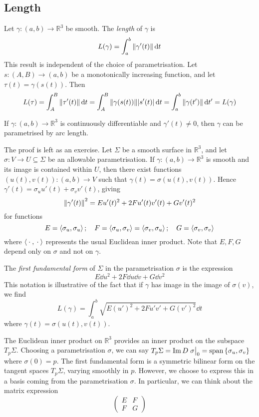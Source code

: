\subsection{Length}
Let \( \gamma \colon (a,b) \to \mathbb R^3 \) be smooth.
The \textit{length} of \( \gamma \) is
\[ L(\gamma) = \int_a^b \norm{\gamma'(t)} \dd{t} \]
This result is independent of the choice of parametrisation.
Let \( s \colon (A,B) \to (a,b) \) be a monotonically increasing function, and let \( \tau(t) = \gamma(s(t)) \).
Then
\[ L(\tau) = \int_A^B \norm{\tau'(t)} \dd{t} = \int_A^B \norm{\gamma(s(t))} \abs{s'(t)} \dd{t} = \int_a^b \norm{\gamma(t')} \dd{t'} = L(\gamma) \]
\begin{lemma}
	If \( \gamma \colon (a,b) \to \mathbb R^3 \) is continuously differentiable and \( \gamma'(t) \neq 0 \), then \( \gamma \) can be parametrised by arc length.
\end{lemma}
The proof is left as an exercise.
Let \( \Sigma \) be a smooth surface in \( \mathbb R^3 \), and let \( \sigma \colon V \to U \subseteq \Sigma \) be an allowable parametrisation.
If \( \gamma \colon (a,b) \to \mathbb R^3 \) is smooth and its image is contained within \( U \), then there exist functions \( (u(t), v(t)) \colon (a,b) \to V \) such that \( \gamma(t) = \sigma(u(t), v(t)) \).
Hence \( \gamma'(t) = \sigma_u u'(t) + \sigma_v v'(t) \), giving
\[ \norm{\gamma'(t)}^2 = E u'(t)^2 + 2F u'(t) v'(t) + G v'(t)^2 \]
for functions
\[ E = \left\langle{\sigma_u, \sigma_u}\right\rangle;\quad F = \left\langle{\sigma_u, \sigma_v}\right\rangle = \left\langle{\sigma_v, \sigma_u}\right\rangle;\quad G = \left\langle{\sigma_v, \sigma_v}\right\rangle \]
where \( \left\langle{{}\cdot{},{}\cdot{}}\right\rangle \) represents the usual Euclidean inner product.
Note that \( E, F, G \) depend only on \( \sigma \) and not on \( \gamma \).
\begin{definition}
	The \textit{first fundamental form} of \( \Sigma \) in the parametrisation \( \sigma \) is the expression
	\[ E \dd{u}^2 + 2F \dd{u} \dd{v} + G \dd{v}^2 \]
	This notation is illustrative of the fact that if \( \gamma \) has image in the image of \( \sigma(v) \), we find
	\[ L(\gamma) = \int_a^b \sqrt{E (u')^2 + 2F u'v' + G (v')^2} \dd{t} \]
	where \( \gamma(t) = \sigma(u(t),v(t)) \).
\end{definition}
\begin{remark}
	The Euclidean inner product on \( \mathbb R^3 \) provides an inner product on the subspace \( T_p \Sigma \).
	Choosing a parametrisation \( \sigma \), we can say \( T_p \Sigma = \Im D \eval{\sigma}_0 = \vecspan{\qty{\sigma_u, \sigma_v}} \) where \( \sigma(0) = p \).
	The first fundamental form is a symmetric bilinear form on the tangent spaces \( T_p \Sigma \), varying smoothly in \( p \).
	However, we choose to express this in a basis coming from the parametrisation \( \sigma \).
	In particular, we can think about the matrix expression
	\[ \begin{pmatrix}
		E & F \\
		F & G
	\end{pmatrix} \]
\end{remark}
